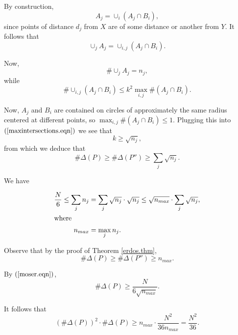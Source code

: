 \documentclass[]{stml-l}
\numberwithin{equation}{chapter}
\theoremstyle{plain}
\theoremstyle{definition}
\theoremstyle{remark}
\begin{document}
By construction,
\begin{equation}
A_j=\cup_i \left( A_j \cap B_i \right),
\end{equation}
 since
points of distance $d_j$ from $X$ are of some distance or another
from $Y$.  It follows that
\begin{equation}
\cup_j A_j=\cup_{i,j} \left( A_j \cap B_i \right).
\end{equation}

Now,
\begin{equation}
\#  \cup_j A_j=n_j,
\end{equation}
 while
\begin{equation} \label{maxintersections.eqn}
\# \cup_{i,j} \left( A_j \cap B_i \right) \leq k^2 \max_{i,j} \# \left( A_j \cap B_i \right).
\end{equation}


Now, $A_j$ and $B_i$ are contained on circles of approximately the
same radius centered at different points, so $\max_{i,j} \# (A_j
\cap B_i) \leq 1$. Plugging this into $(\ref{maxintersections.eqn})$ we see that
\begin{equation}
k \ge \sqrt{n_j},
\end{equation}
 from which we deduce that
\begin{equation} \label{moser.eqn}
\# \Delta(P) \ge \# \Delta(P'') \ge \sum_j \sqrt{n_j}.
\end{equation}


We have

\begin{align}
\frac{N}{6} \leq \sum_j n_j&=\sum_j \sqrt{n_j} \cdot
\sqrt{n_j} \leq \sqrt{n_{max}} \cdot \sum_j \sqrt{n_j}, \\
\intertext{where}
n_{max}&=\max_j n_j.
\end{align}


Observe that by the proof of Theorem \ref{erdos.thm},
\begin{equation}
 \# \Delta(P) \ge \# \Delta(P'') \ge n_{max}.
\end{equation}


By $(\ref{moser.eqn})$,
\begin{equation}
\# \Delta(P) \ge \frac{N}{6 \sqrt{n_{max}}}.
\end{equation}

It follows that
\begin{equation}
{(\# \Delta(P))}^2 \cdot \# \Delta(P) \ge
n_{max} \cdot \frac{N^2}{36 n_{max}}=\frac{N^2}{36}.
\end{equation}
\end{document}
